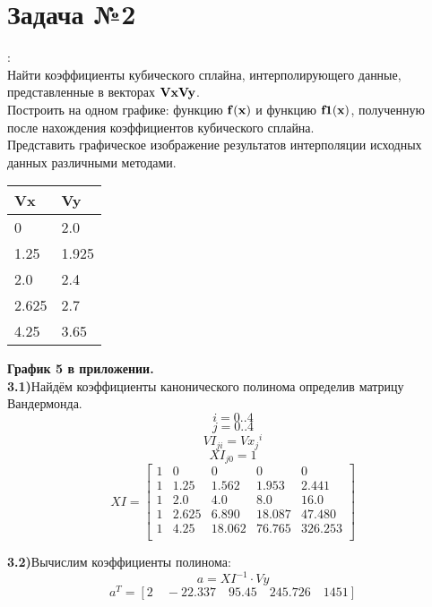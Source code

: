 \documentclass[russian,utf8,nocolumnxxxi,nocolumnxxxii]{eskdtext}
\begin{document}
 \section{Задача №2}
{:}\\
Найти коэффициенты кубического сплайна, интерполирующего данные, представленные в векторах ${\bf Vx  Vy }$.\\

Построить на одном графике: функцию ${\bf f(x)}$ и функцию ${\bf f1(x)}$, полученную после нахождения коэффициентов кубического сплайна.\\

Представить графическое изображение результатов интерполяции исходных данных различными методами.\\
\begin{tabular}[t]{|p{3em}|p{3em}|}
\hline
Vx&Vy\\
\hline
0 & 2.0\\
1.25 & 1.925\\
2.0 & 2.4\\
2.625 & 2.7\\
4.25 & 3.65\\
\hline
\end{tabular}
\hfill \break
\bigskip
{\bf График 5 в приложении.}\\

{\bf3.1)}Найдём коэффициенты канонического полинома определив матрицу  Вандермонда.\\
$$i=0..4$$
$$j=0..4$$
$$ VI_{ji}=Vx{_j}^i $$
$$XI_{j0}=1$$
$$
XI=
\begin{bmatrix}
1 & 0 & 0 & 0 & 0 \\
1 & 1.25 & 1.562 & 1.953 & 2.441\\
1 & 2.0 & 4.0 & 8.0 & 16.0\\
1 & 2.625 & 6.890 & 18.087 & 47.480\\
1 & 4.25 & 18.062 & 76.765 & 326.253\\

\end{bmatrix}
$$

\hfill \break
\bigskip
{\bf3.2)}Вычислим коэффициенты полинома:\\
$$a=XI^{-1}\cdot Vy$$
$$a^T=[2\quad-22.337\quad95.45\quad245.726\quad1451]$$
\hfill \break
\hfill \break
\hfill \break
\hfill \break
\hfill \break
\hfill \break
\end{document}
